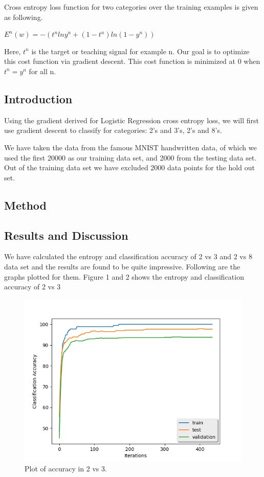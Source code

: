 \documentclass{article} %
\begin{document}
Cross entropy loss function for two categories over the training examples is given as following.\\

\begin{center}
$E^n(w) = -(t^n lny^n + (1-t^n) ln(1-y^n))$\\
\hfill\break
\hfill\break
\end{center}

Here, $t^n$ is the target or teaching signal for example n. Our goal is to optimize this cost function via gradient descent. This cost function is minimized at 0 when $t^n = y^n$ for all n.
\subsection{Introduction}
Using the gradient derived for Logistic Regression cross entropy loss, we will first use gradient descent to classify for categories: 2's and 3's, 2's and 8's.  

We have taken the data from the famous MNIST handwritten data, of which we used the first 20000 as our training data set, and 2000 from the testing data set. Out of the training data set we have excluded 2000 data points for the hold out set.\\
\subsection{Method}
\subsection{Results and Discussion}

We have calculated the entropy and classification accuracy of 2 vs 3 and 2 vs 8 data set and the results are found to be quite impressive. Following are the graphs plotted for them. Figure 1 and 2 shows the entropy and classification accuracy of 2 vs 3

\begin{figure}[h]
\begin{center}
\includegraphics[width=0.8\linewidth]{plt_2vs3_accuracy.png}
\end{center}
\caption{Plot of accuracy in 2 vs 3.}
\end{figure}
\end{document}
